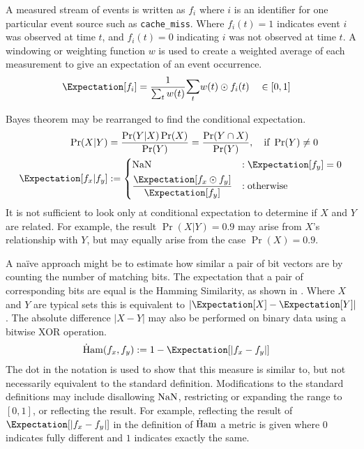 \documentclass[runningheads]{llncs}
\begin{document}
A measured stream of events is written as $f_i$ where $i$ is an identifier for
one particular event source such as \texttt{cache\_miss}.
Where $f_i(t) = 1$ indicates event $i$ was observed at time $t$, and $f_i(t) = 0$
indicating $i$ was not observed at time $t$.
A windowing or weighting function $w$ is used to create a weighted average of
each measurement to give an expectation of an event occurrence.
\begin{align}
\label{eq:def_Ex}
\sEx{f_i} &= \frac{1}{\sum_{t} w(t)}
    \mathlarger{\sum}_{t} w(t) \odot f_i(t)
\quad \in [0,1]
\end{align}

Bayes theorem may be rearranged to find the conditional expectation.
\begin{align}
\label{eq:bayes} %
\Pr(X|Y) &= \frac{\Pr(Y|X) \Pr(X)}{\Pr(Y)} = \frac{\Pr(Y \cap X)}{\Pr(Y)},
    \quad \text{if}\ \Pr(Y) \neq 0
\\
\label{eq:def_cEx}
\sEx{f_x | f_y} &:=
    \begin{dcases}
    \NaN &: \sEx{f_y} = 0
    \\
    \frac{\sEx{f_x \odot f_y}} {\sEx{f_y}} &: \text{otherwise}
    \end{dcases}
\end{align}
It is not sufficient to look only at conditional expectation to determine if $X$
and $Y$ are related.
For example, the result $\Pr(X|Y) = 0.9$ may arise from $X$'s relationship with
$Y$, but may equally arise from the case $\Pr(X) = 0.9$.

A na\"ive approach might be to estimate how similar a pair of bit vectors
are by counting the number of matching bits.
The expectation that a pair of corresponding bits are equal is the Hamming
Similarity\cite{Hamming1950}, as shown in .
Where $X$ and $Y$ are typical sets\cite{InfoMacKay} this is equivalent to
$\left| \sEx{X} - \sEx{Y} \right|$.
The absolute difference $\left| X - Y \right|$ may also be performed on binary
data using a bitwise XOR operation.
\begin{align}
\label{eq:def_Ham}
\Ham(f_x, f_y) &:= 1 - \sEx{\left| f_x - f_y \right|}
\end{align}
The dot in the notation is used to show that this measure is similar to, but not
necessarily equivalent to the standard definition.
Modifications to the standard definitions may include disallowing $\operatorname{NaN}$,
restricting or expanding the range to $[0,1]$, or reflecting the result.
For example, reflecting the result of
$\sEx{\left| f_x - f_y \right|}$ in the definition of $\operatorname{\dot{H}am}$
a metric is given where $0$ indicates fully different and $1$ indicates exactly
the same.
\end{document}
